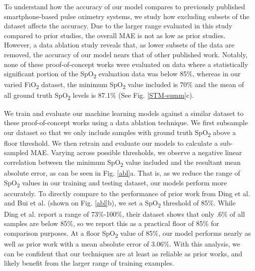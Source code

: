 \documentclass[12pt]{article}
\begin{document}
To understand how the accuracy of our model compares to previously published smartphone-based pulse oximetry systems, we study how excluding subsets of the dataset affects the accuracy. Due to the larger range evaluated in this study compared to prior studies, the overall MAE is not as low as prior studies.  However, a data ablation study reveals that, as lower subsets of the data are removed, the accuracy of our model nears that of other published work. Notably, none of these proof-of-concept works were evaluated on data where a statistically significant portion of the SpO\textsubscript{2} evaluation data was below 85\%, whereas in our varied FiO\textsubscript{2} dataset, the minimum SpO\textsubscript{2} value included is 70\% and the mean of all ground truth SpO\textsubscript{2} levels is 87.1\% (See Fig. \ref{STM-summ}c).

We train and evaluate our machine learning models against a similar dataset to these proof-of-concept works using a data ablation technique. We first subsample our dataset so that we only include samples with ground truth SpO\textsubscript{2} above a floor threshold. We then retrain and evaluate our models to calculate a sub-sampled MAE. Varying across possible thresholds, we observe a negative linear correlation between the minimum SpO\textsubscript{2} value included and the resultant mean absolute error, as can be seen in Fig. \ref{abl}a.  That is, as we reduce the range of SpO\textsubscript{2} values in our training and 
testing dataset, our models perform more accurately. To directly compare to the performance of prior work from Ding et al. and Bui et al. (shown on Fig. \ref{abl}b), we set a SpO\textsubscript{2} threshold of 85\%. While Ding et al. report a range of 73\%-100\%, their dataset shows that only .6\% of all samples are below 85\%, so we report this as a practical floor of 85\% for comparison purposes.
At a floor SpO\textsubscript{2} value of 85\%, our model performs nearly as well as prior work with a mean absolute error of $3.06$\%. 
With this analysis, we can be confident that our techniques are at least as reliable as prior works, and likely benefit from the larger range of training examples.

\label{sec:Classification}
\end{document}
